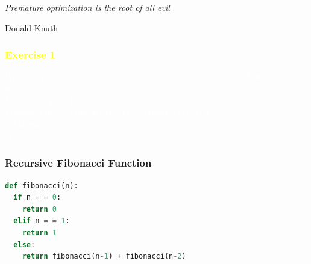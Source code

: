 \documentclass[xcolor=table,10pt,final]{beamer}
\begin{document}
\begin{frame}
\hfill \emph{Premature optimization is the root of all evil}

\hfill Donald Knuth
\end{frame}

{
\begin{frame}
	\frametitle{\textcolor{yellow}{Exercise 1}}
	\textcolor{white}{Write a Python function to compute the \emph{n-th Fibonacci} number.\newline\newline
	 {\tt fibonacci(0) = 0\\
	 fibonacci(1) = 1\\
	 fibonacci(n) = fibonacci(n-1) + fibonacci(n-2)}\newline\newline
	 Example: \\ {\tt > fibonacci(10)\\55}
	}
\end{frame}
}

\begin{frame}[fragile]
	\frametitle{Recursive Fibonacci Function}	
	\begin{lstlisting}[language=Python]
def fibonacci(n):
  if n = = 0:
    return 0
  elif n = = 1:
    return 1
  else:
    return fibonacci(n-1) + fibonacci(n-2)
	\end{lstlisting}
\end{frame}
\end{document}

